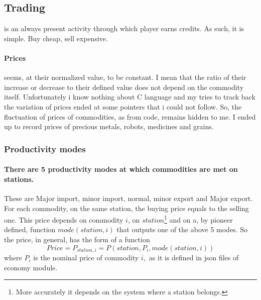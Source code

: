 \documentclass[]{article}
\begin{document}
\subsection{Trading} is an always present activity through which player earns credits. As such, it is simple. Buy cheap, sell expensive.
\paragraph{Prices} seems, at their normalized value, to be constant. I mean that the ratio of their increase or decrease to their defined value does not depend on the commodity itself. Unfortunately i know nothing about C language and my tries to track back the variation of prices ended at some pointers that i could not follow. So, the fluctuation of prices of commodities, as from code, remains hidden to me. I ended up to record prices of precious metals, robots, medicines and grains.
\subsubsection{Productivity modes}\label{productivityModes}
\paragraph{There are 5 productivity modes at which commodities are met on stations.} These are Major import, minor import, normal, minor export and Major export. For each commodity, on the same station, the buying price equals to the selling one. This price depends on commodity $i$, on $station$\footnote{More accurately it depends on the system where a station belongs.} and on a, by pioneer defined, function $mode(station, i)$ that outputs one of the above 5 modes.  So the price, in general, has the form of a function
 \[Price=P_{station,i}= P(station, P_{i}, mode(station,i)) \] 
 where $P_{i}$ is the nominal price of commodity $i,$ as it is defined in json files of economy module.
\end{document}
